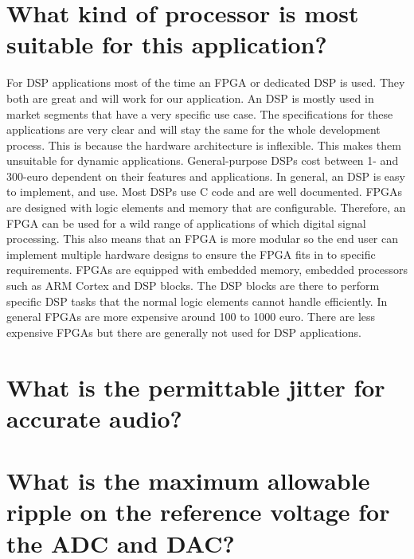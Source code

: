 \section{What kind of processor is most suitable for this application?}
For DSP applications most of the time an FPGA or dedicated DSP is used. They both are great and will work for our application. 
An DSP is mostly used in market segments that have a very specific use case. The specifications for these applications are very clear and will stay the same for the whole development process. This is because the hardware architecture is inflexible. This makes them unsuitable for dynamic applications. General-purpose DSPs cost between 1- and 300-euro dependent on their features and applications. In general, an DSP is easy to implement, and use. Most DSPs use C code and are well documented. 
FPGAs are designed with logic elements and memory that are configurable. Therefore, an FPGA can be used for a wild range of applications of which digital signal processing. This also means that an FPGA is more modular so the end user can implement multiple hardware designs to ensure the FPGA fits in to specific requirements. FPGAs are equipped with embedded memory, embedded processors such as ARM Cortex and DSP blocks. The DSP blocks are there to perform specific DSP tasks that the normal logic elements cannot handle efficiently. In general FPGAs are more expensive around 100 to 1000 euro. There are less expensive FPGAs but there are generally not used for DSP applications.\\

\section{What is the permittable jitter for accurate audio?}

\section{What is the maximum allowable ripple on the reference voltage for the ADC and DAC?}
